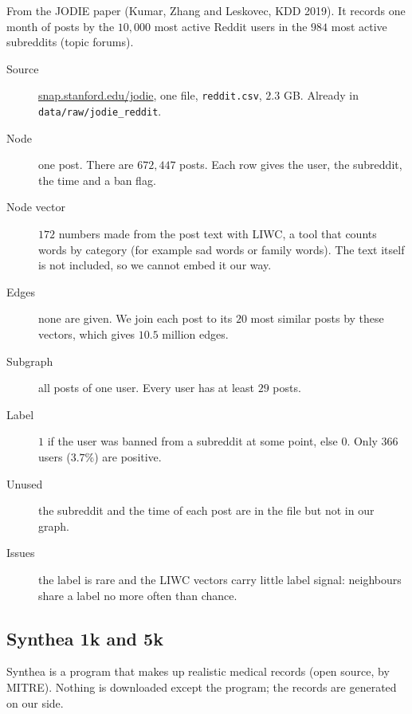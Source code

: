 \documentclass[11pt]{article}
\begin{document}
From the JODIE paper (Kumar, Zhang and Leskovec, KDD 2019). It records one month of posts by the
$10{,}000$ most active Reddit users in the $984$ most active subreddits (topic forums).

\begin{description}
\item[Source] \href{http://snap.stanford.edu/jodie/reddit.csv}{snap.stanford.edu/jodie}, one
file, \texttt{reddit.csv}, $2.3$ GB. Already in \texttt{data/raw/jodie\_reddit}.
\item[Node] one post. There are $672{,}447$ posts. Each row gives the user, the subreddit, the
time and a ban flag.
\item[Node vector] $172$ numbers made from the post text with LIWC, a tool that counts words by
category (for example sad words or family words). The text itself is not included, so we cannot
embed it our way.
\item[Edges] none are given. We join each post to its $20$ most similar posts by these vectors,
which gives $10.5$ million edges.
\item[Subgraph] all posts of one user. Every user has at least $29$ posts.
\item[Label] $1$ if the user was banned from a subreddit at some point, else $0$. Only $366$
users ($3.7\%$) are positive.
\item[Unused] the subreddit and the time of each post are in the file but not in our graph.
\item[Issues] the label is rare and the LIWC vectors carry little label signal: neighbours share
a label no more often than chance.
\end{description}

\subsection*{Synthea 1k and 5k}

Synthea is a program that makes up realistic medical records (open source, by MITRE). Nothing is
downloaded except the program; the records are generated on our side.
\end{document}
